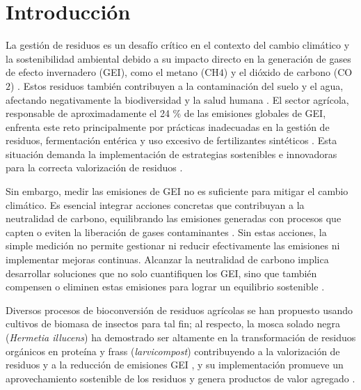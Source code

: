 \chapter{Introducción}

La gestión de residuos es un desafío crítico en el contexto del cambio climático y la sostenibilidad ambiental debido a su impacto directo en la generación de gases de efecto invernadero (GEI), como el metano (CH$4$) y el dióxido de carbono (CO$2$)
\parencite{filonchyk2024greenhouse,kabangeMitigatingGreenhouseGas2023}. Estos residuos también contribuyen a la contaminación del suelo y el agua, afectando negativamente la biodiversidad y la salud humana \parencite{FAO2021,IPCC2014,Leddin2024,guthrieImpactAmmoniaEmissions2018a}. El sector agrícola, responsable de aproximadamente el 24 \% de las emisiones globales de GEI, enfrenta este reto principalmente por prácticas inadecuadas en la gestión de residuos, fermentación entérica y uso excesivo de fertilizantes sintéticos \parencite{Smith2014}. Esta situación demanda la implementación de estrategias sostenibles e innovadoras para la correcta valorización de residuos \parencite{foodandagricultureorganizationoftheunitednationsfaoEmissionsDueAgriculture2020,lynchAgriculturesContributionClimate2021}.

Sin embargo, medir las emisiones de GEI no es suficiente para mitigar el cambio climático. Es esencial integrar acciones concretas que contribuyan a la neutralidad de carbono, equilibrando las emisiones generadas con procesos que capten o eviten la liberación de gases contaminantes \parencite{nunesRisingThreatAtmospheric2023,fawzyStrategiesMitigationClimate2020}. Sin estas acciones, la simple medición no permite gestionar ni reducir efectivamente las emisiones ni implementar mejoras continuas. Alcanzar la neutralidad de carbono implica desarrollar soluciones que no solo cuantifiquen los GEI, sino que también compensen o eliminen estas emisiones para lograr un equilibrio sostenible \parencite{IPCC2014}.

Diversos procesos de bioconversión de residuos agrícolas se han propuesto usando cultivos de biomasa de insectos para tal fin; al respecto, la mosca solado negra (\textit{Hermetia illucens}) ha demostrado ser altamente en la transformación  de residuos orgánicos en proteína y frass (\textit{larvicompost}) contribuyendo a la valorización de residuos y a la reducción de emisiones GEI \parencite{Bermudez2023,Chia2019,barragan2017nutritional}, y su implementación promueve un aprovechamiento sostenible de los residuos y genera productos de valor agregado \parencite{Surendra2016,amrulReviewOrganicWaste2022}.

